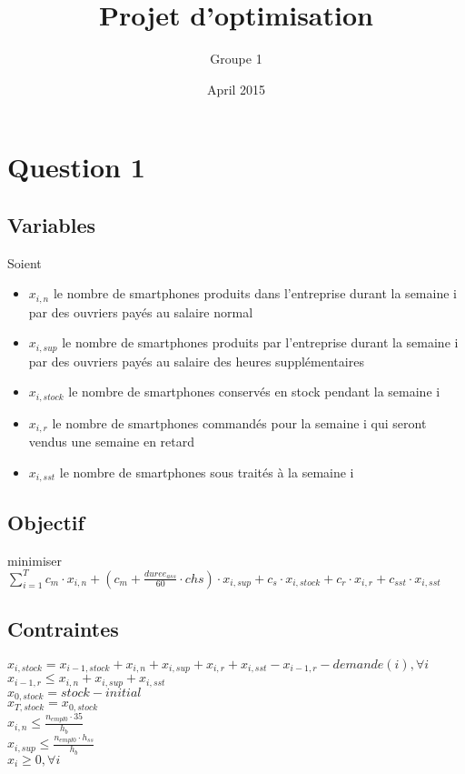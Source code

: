 \documentclass{article}
\title{Projet d'optimisation}
\author{Groupe 1}
\date{April 2015}
\begin{document}
\maketitle

\section{Question 1}

\subsection*{Variables}
Soient 
\begin{itemize}
\item $x_{i,n}$ le nombre de smartphones produits dans l'entreprise durant la semaine i par des ouvriers payés au salaire normal
\item $x_{i,sup}$ le nombre de smartphones produits par l'entreprise durant la semaine i par des ouvriers payés au salaire des heures supplémentaires

\item $x_{i,stock}$ le nombre de smartphones conservés en stock pendant la semaine i
\item $x_{i,r}$ le nombre de smartphones commandés pour la semaine i qui seront vendus une semaine en retard
\item $x_{i,sst}$ le nombre de smartphones sous traités à la semaine i
\end{itemize}

\subsection*{Objectif}

minimiser $\sum_{i=1}^{T} c_m \cdot x_{i,n} + (c_m + \frac{duree_{ass}}{60} \cdot chs ) \cdot x_{i,sup} + c_s \cdot x_{i,stock} + c_r \cdot x_{i,r} + c_{sst} \cdot x_{i,sst} $

\subsection*{Contraintes}

$x_{i,stock} = x_{i-1,stock} + x_{i,n} + x_{i,sup} + x_{i,r} + x_{i,sst} - x_{i-1,r} - demande(i), \forall i$ \\
$x_{i-1,r} \leq  x_{i,n} + x_{i,sup} + x_{i,sst}$ \\ %
$x_{0, stock} = stock-initial$ \\
$x_{T, stock} = x_{0, stock}$ \\
$x_{i,n} \leq \frac{n_{empl0} \cdot 35}{h_b}$ \\
$x_{i,sup} \leq \frac{n_{empl0} \cdot h_{ss}}{h_{b}}$ \\
$x_i \geq 0, \forall i$ \\
\end{document}
